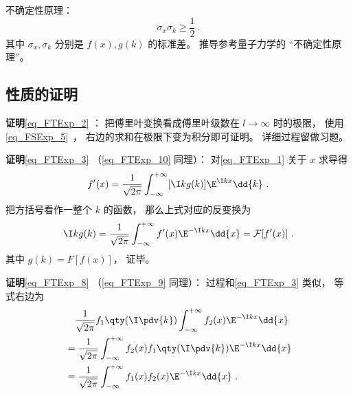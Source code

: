 不确定性原理：
\begin{equation}
\sigma_x \sigma_k \geqslant \frac{1}{2}~.
\end{equation}
其中 $\sigma_x, \sigma_k$ 分别是 $f(x), g(k)$ 的标准差。 推导参考量子力学的 “不确定性原理”。

\subsection{性质的证明}

\textbf{证明}\autoref{eq_FTExp_2} ： 把傅里叶变换看成傅里叶级数在 $l \to \infty$ 时的极限， 使用\autoref{eq_FSExp_5}~， 右边的求和在极限下变为积分即可证明。 详细过程留做习题。

\textbf{证明}\autoref{eq_FTExp_3} （\autoref{eq_FTExp_10} 同理）： 对\autoref{eq_FTExp_1} 关于 $x$ 求导得
\begin{equation}
f'(x) = \frac{1}{\sqrt{2\pi }} \int_{-\infty }^{+\infty } [\I kg(k)]\E^{\I kx} \dd{k}~.
\end{equation}
把方括号看作一整个 $k$ 的函数， 那么上式对应的反变换为
\begin{equation}
\I kg(k) = \frac{1}{\sqrt{2\pi }} \int_{-\infty }^{+\infty } f'(x) \E^{-\I kx} \dd{x} = \mathcal F [f'(x)]~.
\end{equation}
其中 $g(k) = F [f(x)]$， 证毕。

\textbf{证明}\autoref{eq_FTExp_8} （\autoref{eq_FTExp_9} 同理）： 过程和\autoref{eq_FTExp_3} 类似， 等式右边为
\begin{equation}
\begin{aligned}
& \quad \frac{1}{\sqrt{2\pi }} f_1\qty(\I \pdv{k}) \int_{-\infty }^{+\infty } f_2(x)\E^{-\I kx} \dd{x}\\
&= \frac{1}{\sqrt{2\pi }} \int_{-\infty }^{+\infty } f_2(x) f_1\qty(\I \pdv{k})\E^{-\I kx} \dd{x}\\
&= \frac{1}{\sqrt{2\pi }} \int_{-\infty }^{+\infty } f_1(x) f_2(x) \E^{-\I kx} \dd{x}~.
\end{aligned}
\end{equation}
